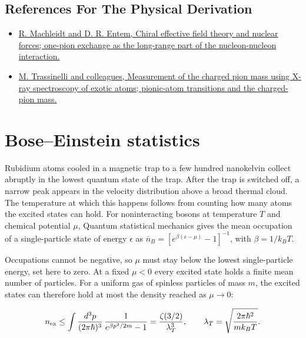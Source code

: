 \documentclass[11pt,oneside]{book}
\newenvironment{centeredalign}{\[\begin{gathered}[c]}{\end{gathered}\]}
\begin{document}
\subsection*{References For The Physical Derivation}
\begin{itemize}
\item \href{https://arxiv.org/abs/1105.2919}{R. Machleidt and D. R. Entem, Chiral effective field theory and nuclear forces; one-pion exchange as the long-range part of the nucleon-nucleon interaction.}
\item \href{https://arxiv.org/abs/1605.03300}{M. Trassinelli and colleagues, Measurement of the charged pion mass using X-ray spectroscopy of exotic atoms; pionic-atom transitions and the charged-pion mass.}
\end{itemize}





\clearpage

\section{Bose–Einstein statistics}

\label{topic:bose-einstein-statistics}

Rubidium atoms cooled in a magnetic trap to a few hundred nanokelvin collect abruptly in the lowest quantum state of the trap. After the trap is switched off, a narrow peak appears in the velocity distribution above a broad thermal cloud. The temperature at which this happens follows from counting how many atoms the excited states can hold. For noninteracting bosons at temperature \(T\) and chemical potential \(\mu\), Quantum statistical mechanics gives the mean occupation of a single-particle state of energy \(\epsilon\) as \(\overline n_B=[e^{\beta(\epsilon-\mu)}-1]^{-1}\), with \(\beta=1/k_BT\).

Occupations cannot be negative, so \(\mu\) must stay below the lowest single-particle energy, set here to zero. At a fixed \(\mu<0\) every excited state holds a finite mean number of particles. For a uniform gas of spinless particles of mass \(m\), the excited states can therefore hold at most the density reached as \(\mu\to0\):

\begin{centeredalign}
n_{\rm ex}\leq\int\frac{d^3p}{(2\pi\hbar)^3}\,\frac{1}{e^{\beta p^2/2m}-1}
=\frac{\zeta(3/2)}{\lambda_T^3},\qquad
\lambda_T=\sqrt{\frac{2\pi\hbar^2}{mk_BT}}.
\end{centeredalign}
\end{document}

